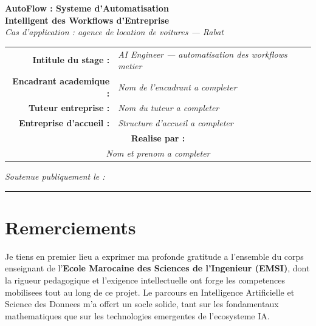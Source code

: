 \documentclass[12pt,a4paper,openany]{report}
\newcommand{\reportauthor}{\textit{Nom et prenom a completer}}
\newcommand{\academicadvisor}{\textit{Nom de l'encadrant a completer}}
\newcommand{\companyadvisor}{\textit{Nom du tuteur a completer}}
\newcommand{\hostcompany}{\textit{Structure d'accueil a completer}}
\begin{document}
\begin{titlepage}
\begin{center}
\vspace{0.48cm}

{\LARGE\bfseries\color{titleBlue}
  AutoFlow : Systeme d'Automatisation\\[0.15cm]
  Intelligent des Workflows d'Entreprise}\\[0.25cm]

{\small\itshape\color{titleBlue!80} Cas d'application : agence de location de voitures --- Rabat}

\vspace{0.38cm}

\begin{minipage}{0.82\textwidth}\centering
\small
\begin{tabular}{@{}r@{\hspace{0.35cm}}l@{}}
\textbf{Intitule du stage :} & \textit{AI Engineer --- automatisation des workflows metier} \\[0.18cm]
\textbf{Encadrant academique :} & \academicadvisor \\[0.16cm]
\textbf{Tuteur entreprise :}    & \companyadvisor \\[0.16cm]
\textbf{Entreprise d'accueil :} & \hostcompany \\[0.32cm]
\multicolumn{2}{c}{\textbf{Realise par :}} \\[0.16cm]
\multicolumn{2}{c}{\reportauthor} \\
\end{tabular}
\end{minipage}

\vspace{0.22cm}
{\scriptsize\color{gray!100}\textit{Soutenue publiquement le :} \rule{3cm}{0.4pt}}
\end{center}
\end{titlepage}

\chapter*{Remerciements}
\thispagestyle{plain}

Je tiens en premier lieu a exprimer ma profonde gratitude a l'ensemble du corps enseignant de l'\textbf{Ecole Marocaine des Sciences de l'Ingenieur (EMSI)}, dont la rigueur pedagogique et l'exigence intellectuelle ont forge les competences mobilisees tout au long de ce projet. Le parcours en Intelligence Artificielle et Science des Donnees m'a offert un socle solide, tant sur les fondamentaux mathematiques que sur les technologies emergentes de l'ecosysteme IA.
\end{document}

